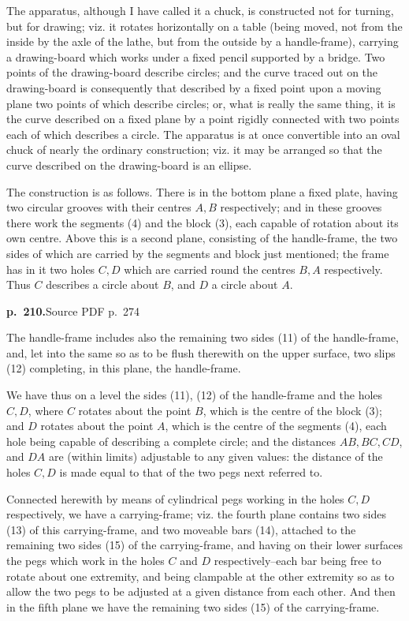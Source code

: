 \documentclass[11pt,a4paper]{article}
\newcommand{\sourcepage}[2]{\par\bigskip\noindent\textbf{p.~#1.}\hfill{\footnotesize Source PDF p.~#2}\par\nobreak\medskip}
\begin{document}
The apparatus, although I have called it a chuck, is constructed not for turning, but for drawing; viz. it rotates horizontally on a table (being moved, not from the inside by the axle of the lathe, but from the outside by a handle-frame), carrying a drawing-board which works under a fixed pencil supported by a bridge. Two points of the drawing-board describe circles; and the curve traced out on the drawing-board is consequently that described by a fixed point upon a moving plane two points of which describe circles; or, what is really the same thing, it is the curve described on a fixed plane by a point rigidly connected with two points each of which describes a circle. The apparatus is at once convertible into an oval chuck of nearly the ordinary construction; viz. it may be arranged so that the curve described on the drawing-board is an ellipse.

The construction is as follows. There is in the bottom plane a fixed plate, having two circular grooves with their centres $A,B$ respectively; and in these grooves there work the segments (4) and the block (3), each capable of rotation about its own centre. Above this is a second plane, consisting of the handle-frame, the two sides of which are carried by the segments and block just mentioned; the frame has in it two holes $C,D$ which are carried round the centres $B,A$ respectively. Thus $C$ describes a circle about $B$, and $D$ a circle about $A$.

\sourcepage{210}{274}
The handle-frame includes also the remaining two sides (11) of the handle-frame, and, let into the same so as to be flush therewith on the upper surface, two slips (12) completing, in this plane, the handle-frame.

We have thus on a level the sides (11), (12) of the handle-frame and the holes $C,D$, where $C$ rotates about the point $B$, which is the centre of the block (3); and $D$ rotates about the point $A$, which is the centre of the segments (4), each hole being capable of describing a complete circle; and the distances $AB,BC,CD$, and $DA$ are (within limits) adjustable to any given values: the distance of the holes $C,D$ is made equal to that of the two pegs next referred to.

Connected herewith by means of cylindrical pegs working in the holes $C,D$ respectively, we have a carrying-frame; viz. the fourth plane contains two sides (13) of this carrying-frame, and two moveable bars (14), attached to the remaining two sides (15) of the carrying-frame, and having on their lower surfaces the pegs which work in the holes $C$ and $D$ respectively--each bar being free to rotate about one extremity, and being clampable at the other extremity so as to allow the two pegs to be adjusted at a given distance from each other. And then in the fifth plane we have the remaining two sides (15) of the carrying-frame.
\end{document}
